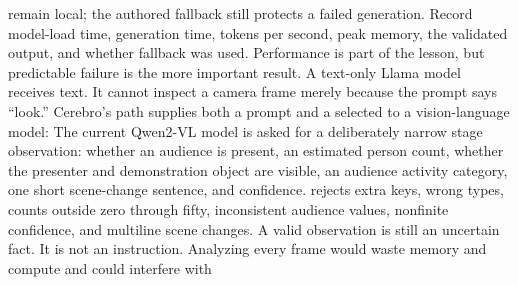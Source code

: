 {}remain local; the authored fallback still protects a failed generation.\markdownRendererOlItemEnd 
\markdownRendererOlEnd \markdownRendererInterblockSeparator
{}Record model-load time, generation time, tokens per second, peak memory, the\markdownRendererSoftLineBreak
{}validated output, and whether fallback was used. Performance is part of the\markdownRendererSoftLineBreak
{}lesson, but predictable failure is the more important result.\markdownRendererInterblockSeparator
{}\markdownRendererThematicBreak{}\markdownRendererInterblockSeparator
{}
\markdownRendererSectionEnd 
\markdownRendererSectionEnd \markdownRendererSectionBegin
{}\markdownRendererInterblockSeparator
{}A text-only Llama model receives text. It cannot inspect a camera frame merely\markdownRendererSoftLineBreak
{}because the prompt says “look.” Cerebro's  path supplies both a prompt\markdownRendererSoftLineBreak
{}and a selected  to a vision-language model:\markdownRendererInterblockSeparator
{}\markdownRendererInterblockSeparator
{}The current Qwen2-VL model is asked for a deliberately narrow stage\markdownRendererSoftLineBreak
{}observation: whether an audience is present, an estimated person count,\markdownRendererSoftLineBreak
{}whether the presenter and demonstration object are visible, an audience\markdownRendererSoftLineBreak
{}activity category, one short scene-change sentence, and confidence.\markdownRendererInterblockSeparator
{}\markdownRendererInterblockSeparator
{} rejects extra keys, wrong types, counts outside\markdownRendererSoftLineBreak
{}zero through fifty, inconsistent audience values, nonfinite confidence, and\markdownRendererSoftLineBreak
{}multiline scene changes. A valid observation is still an uncertain fact. It is\markdownRendererSoftLineBreak
{}not an instruction.\markdownRendererInterblockSeparator
{}\markdownRendererSectionBegin
{}\markdownRendererInterblockSeparator
{}Analyzing every frame would waste memory and compute and could interfere with\markdownRendererSoftLineBreak
